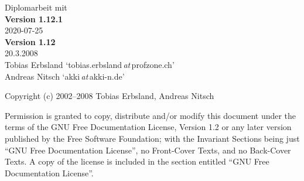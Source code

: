 %
%

\begin{titlepage}
	\vspace*{7cm}
	\begin{center}
		\Huge
		Diplomarbeit mit \DMLLaTeX\\
		\vspace{1cm}
		\large
		\textbf{Version 1.12.1}\\
		2020-07-25\\
		\textbf{Version 1.12}\\
		20.3.2008\\
		\vspace{2cm}
		Tobias Erbsland \enquote*{tobias.erbsland\,\emph{at}\,profzone.ch}\\
		Andreas Nitsch \enquote*{akki\,\emph{at}\,akki-n.de}\\
	\end{center}
	\normalsize
	\vfill
	Copyright (c) 2002--2008 Tobias Erbsland, Andreas Nitsch

Permission is granted to copy, distribute and/or modify this document
under the terms of the GNU Free Documentation License, Version 1.2
or any later version published by the Free Software Foundation;
with the Invariant Sections being just \enquote{GNU Free Documentation License},
no Front-Cover Texts, and no Back-Cover Texts.
A copy of the license is included in the section entitled \enquote{GNU
Free Documentation License}.
	
\end{titlepage}

\tableofcontents

\listoffigures

\listoftables


%
%
